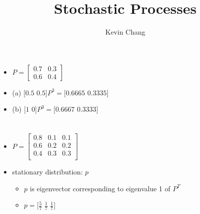 \documentclass[a4paper]{article}
\title{Stochastic Processes}
\author{Kevin Chang}
\begin{document}
\maketitle

\section{}
\begin{itemize}
        \begin{figure} [H]
            \texttt{[image: image/1.png]}
        \end{figure}
    \item $P = \left[ \begin{array}{cc} 0.7 & 0.3 \\ 0.6 & 0.4 \end{array} \right]$
    \item (a) $[0.5$ $0.5] P^3 = [0.6665$ $0.3335]$
    \item (b) $[1$ $0] P^3 = [0.6667$ $0.3333]$
\end{itemize}

\section{}
\begin{itemize}
        \begin{figure} [H]
            \texttt{[image: image/2.png]}
        \end{figure}
    \item $P = \left[ \begin{array}{ccc}
                0.8 & 0.1 & 0.1 \\
                0.6 & 0.2 & 0.2 \\
                0.4 & 0.3 & 0.3 \\
            \end{array} \right]$
    \item stationary distribution: $p$
        \begin{itemize}
            \item $p$ is eigenvector corresponding to eigenvalue 1 of $P^T$
            \item $p = [\frac{5}{7}$ $\frac{1}{7}$ $\frac{1}{7}]$
        \end{itemize}
\end{itemize}
\end{document}

